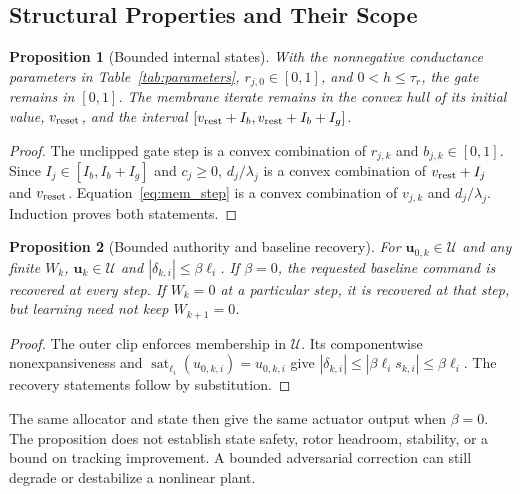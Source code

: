 \documentclass[letterpaper,10pt,conference]{IEEEtran}
\newcommand{\sat}{\operatorname{sat}}
\newtheorem{proposition}{Proposition}
\begin{document}
\subsection{Structural Properties and Their Scope}
\begin{proposition}[Bounded internal states]
With the nonnegative conductance parameters in Table~\ref{tab:parameters},
$r_{j,0}\in[0,1]$, and $0<h\le\tau_r$, the gate remains in $[0,1]$.
The membrane iterate remains in the convex hull of its initial value,
$v_{\rm reset}$, and the interval
$[v_{\rm rest}+I_b,v_{\rm rest}+I_b+I_g]$.
\end{proposition}
\begin{proof}
The unclipped gate step is a convex combination of $r_{j,k}$ and
$b_{j,k}\in[0,1]$. Since $I_j\in[I_b,I_b+I_g]$ and $c_j\ge0$,
$d_j/\lambda_j$ is a convex combination of $v_{\rm rest}+I_j$ and
$v_{\rm reset}$. Equation~\eqref{eq:mem_step} is a convex combination of
$v_{j,k}$ and $d_j/\lambda_j$. Induction proves both statements.
\end{proof}

\begin{proposition}[Bounded authority and baseline recovery]
\label{prop:authority}
For $\bm u_{0,k}\in\mathcal U$ and any finite $W_k$,
$\bm u_k\in\mathcal U$ and $|\delta_{k,i}|\le\beta\ell_i$.
If $\beta=0$, the requested baseline command is recovered at every step.
If $W_k=0$ at a particular step, it is recovered at that step, but learning
need not keep $W_{k+1}=0$.
\end{proposition}
\begin{proof}
The outer clip enforces membership in $\mathcal U$. Its componentwise
nonexpansiveness and $\sat_{\ell_i}(u_{0,k,i})=u_{0,k,i}$ give
$|\delta_{k,i}|\le|\beta\ell_i s_{k,i}|\le\beta\ell_i$.
The recovery statements follow by substitution.
\end{proof}
The same allocator and state then give the same actuator output when
$\beta=0$. The proposition does not establish state safety, rotor
headroom, stability, or a bound on tracking improvement. A bounded
adversarial correction can still degrade or destabilize a nonlinear plant.
\end{document}
